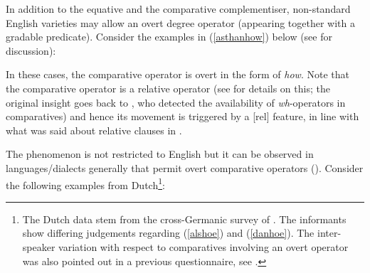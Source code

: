 In addition to the equative and the comparative complementiser, non-standard English varieties may allow an overt degree operator (appearing together with a gradable predicate). Consider the examples in (\ref{asthanhow}) below (see \citealt[91--92]{bacskaiatkari2018langsci} for discussion):

\ea \label{asthanhow} 
\z 
\z

In these cases, the comparative operator is overt in the form of \textit{how}. Note that the comparative operator is a relative operator (see \citealt{bacskaiatkari2014diss} for details on this; the original insight goes back to \citealt{chomsky1977}, who detected the availability of \textit{wh}-operators in comparatives) and hence its movement is triggered by a [rel] feature, in line with what was said about relative clauses in .

\begin{sloppypar}
The phenomenon is not restricted to English but it can be observed in languages\slash dialects generally that permit overt comparative operators (\citealt[98--129]{bacskaiatkari2014diss}). Consider the following examples from Dutch\footnote{The Dutch data stem from the cross-Germanic survey of \citet[51--52, 61--62]{bacskaiatkaribaudisch2018}. The informants show differing judgements regarding (\ref{alshoe}) and (\ref{danhoe}). The inter-speaker variation with respect to comparatives involving an overt operator was also pointed out in a previous questionnaire, see \citet[115]{bacskaiatkari2014diss}.}:
\end{sloppypar}

\ea
{}
\z 
\z

